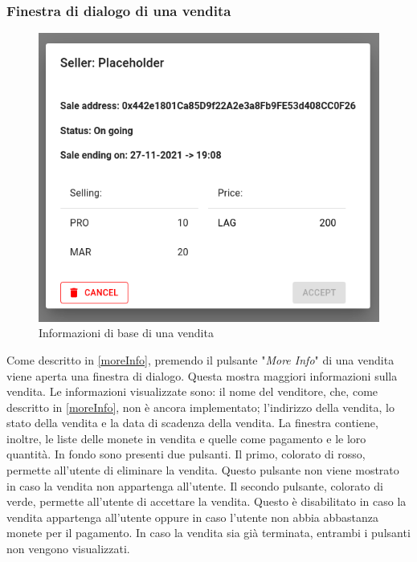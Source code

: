 \documentclass[a4paper]{article}
\begin{document}
        \subsubsection{Finestra di dialogo di una vendita}
        \begin{figure}[H]
          \includegraphics[scale=0.5, fbox]{saleInfo.png}
          \centering
          \caption{Informazioni di base di una vendita}
          \centering
          \label{fig:sale}
        \end{figure}
        Come descritto in \ref{moreInfo}, premendo il pulsante "\emph{More Info}" di una vendita viene aperta una finestra di dialogo. Questa mostra maggiori informazioni sulla vendita. Le informazioni visualizzate sono: il nome del venditore, che, come descritto in \ref{moreInfo}, non è ancora implementato;
        l'indirizzo della vendita, lo stato della vendita e la data di scadenza della vendita. La finestra contiene, inoltre, le liste delle monete in vendita e quelle come pagamento e le loro quantità. In fondo sono presenti due pulsanti. Il primo, colorato di rosso, permette all'utente di eliminare la vendita.
        Questo pulsante non viene mostrato in caso la vendita non appartenga all'utente. Il secondo pulsante, colorato di verde, permette all'utente di accettare la vendita. Questo è disabilitato in caso la vendita appartenga all'utente oppure in caso l'utente non abbia abbastanza monete per il pagamento.
        In caso la vendita sia già terminata, entrambi i pulsanti non vengono visualizzati.
\end{document}
